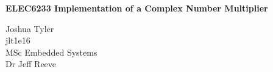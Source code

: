 


	
{
	\centering
	{\Large\bfseries ELEC6233  Implementation of a Complex Number Multiplier \par}
	\vspace{1cm}
	{ Joshua Tyler\\
		jlt1e16\\
		MSc Embedded Systems\\
		Dr Jeff Reeve
		\par}
	\vspace{1cm}
}
	
\begin{abstract}

\end{abstract}



\clearpage







          
